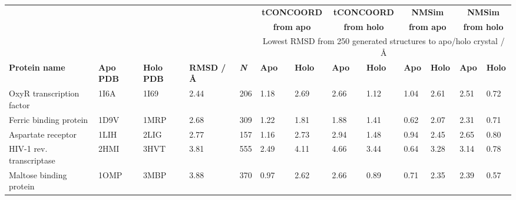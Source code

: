 \begin{table}
\centering

\begin{small}
\begin{tabular}{rrrrrllllllll}
\hline
      &       &       &       &       & \multicolumn{2}{c}{\textbf{tCONCOORD}} & \multicolumn{2}{c}{\textbf{tCONCOORD}} & \multicolumn{2}{c}{\textbf{NMSim}} & \multicolumn{2}{c}{\textbf{NMSim}} \\
      &       &       &       &       & \multicolumn{2}{c}{\textbf{from apo}} & \multicolumn{2}{c}{\textbf{from holo}} & \multicolumn{2}{c}{\textbf{from apo}} & \multicolumn{2}{c}{\textbf{from holo}} \\
      &       &       &       &       & \multicolumn{8}{c}{Lowest RMSD from 250 generated structures to apo/holo crystal / \AA} \\
\multicolumn{1}{l}{\textbf{Protein name}} & \multicolumn{1}{l}{\textbf{Apo PDB}} & \multicolumn{1}{l}{\textbf{Holo PDB}} & \multicolumn{1}{l}{\textbf{RMSD / \AA}} & \multicolumn{1}{l}{\textit{\textbf{N}}} & \textbf{Apo} & \textbf{Holo} & \textbf{Apo} & \textbf{Holo} & \textbf{Apo} & \textbf{Holo} & \textbf{Apo} & \textbf{Holo} \\
\hline
\multicolumn{1}{l}{OxyR transcription factor} & \multicolumn{1}{l}{1I6A} & \multicolumn{1}{l}{1I69} & \multicolumn{1}{l}{2.44} & \multicolumn{1}{l}{206} & 1.18  & 2.69  & 2.66  & 1.12  & 1.04  & 2.61  & 2.51  & 0.72 \\
\multicolumn{1}{l}{Ferric binding protein}    & \multicolumn{1}{l}{1D9V} & \multicolumn{1}{l}{1MRP} & \multicolumn{1}{l}{2.68} & \multicolumn{1}{l}{309} & 1.22  & 1.81  & 1.88  & 1.41  & 0.62  & 2.07  & 2.31  & 0.71 \\
\multicolumn{1}{l}{Aspartate receptor}        & \multicolumn{1}{l}{1LIH} & \multicolumn{1}{l}{2LIG} & \multicolumn{1}{l}{2.77} & \multicolumn{1}{l}{157} & 1.16  & 2.73  & 2.94  & 1.48  & 0.94  & 2.45  & 2.65  & 0.80 \\
\multicolumn{1}{l}{HIV-1 rev. transcriptase}  & \multicolumn{1}{l}{2HMI} & \multicolumn{1}{l}{3HVT} & \multicolumn{1}{l}{3.81} & \multicolumn{1}{l}{555} & 2.49  & 4.11  & 4.66  & 3.44  & 0.64  & 3.28  & 3.14  & 0.78 \\
\multicolumn{1}{l}{Maltose binding protein}   & \multicolumn{1}{l}{1OMP} & \multicolumn{1}{l}{3MBP} & \multicolumn{1}{l}{3.88} & \multicolumn{1}{l}{370} & 0.97  & 2.62  & 2.66  & 0.89  & 0.71  & 2.35  & 2.39  & 0.57 \\

\end{tabular}
\end{small}
\end{table}
